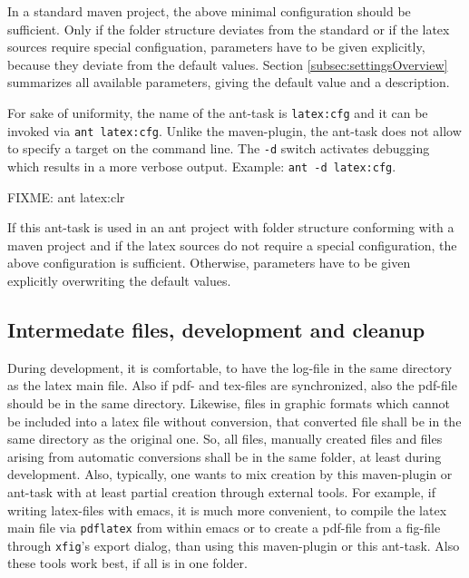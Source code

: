 \documentclass[12pt]{article}
\begin{document}
In a standard maven project, 
the above minimal configuration should be sufficient. 
Only if the folder structure deviates from the standard 
or if the latex sources require special configuation, 
parameters have to be given explicitly, 
because they deviate from the default values. 
Section \ref{subsec:settingsOverview} summarizes all available parameters, 
giving the default value and a description. 


For sake of uniformity, 
the name of the ant-task is {\tt latex:cfg} 
and it can be invoked via {\tt ant latex:cfg}. 
Unlike the maven-plugin, the ant-task 
does not allow to specify a target on the command line. 
The {\tt -d} switch activates debugging 
which results in a more verbose output. 
Example: {\tt ant -d latex:cfg}. 

FIXME: ant latex:clr 

If this ant-task is used in an ant project 
with folder structure conforming with a maven project 
and if the latex sources do not require a special configuration, 
the above configuration is sufficient. 
Otherwise, parameters have to be given explicitly 
overwriting the default values. 

\subsection{Intermedate files, development and cleanup}\label{subsec:devel}

During development, it is comfortable, 
to have the log-file in the same directory as the latex main file. 
Also if pdf- and tex-files are synchronized, 
also the pdf-file should be in the same directory. 
Likewise, files in graphic formats 
which cannot be included into a latex file without conversion, 
that converted file shall be in the same directory as the original one. 
So, all files, manually created files 
and files arising from automatic conversions 
shall be in the same folder, at least during development. 
Also, typically, one wants to mix creation by this maven-plugin or ant-task 
with at least partial creation through external tools. 
For example, if writing latex-files with emacs, 
it is much more convenient, to compile the latex main file 
via {\tt pdflatex} from within emacs 
or to create a pdf-file from a \gls{fig}-file 
through {\tt xfig}'s export dialog, 
than using this maven-plugin or this ant-task. 
Also these tools work best, if all is in one folder. 
\end{document}
